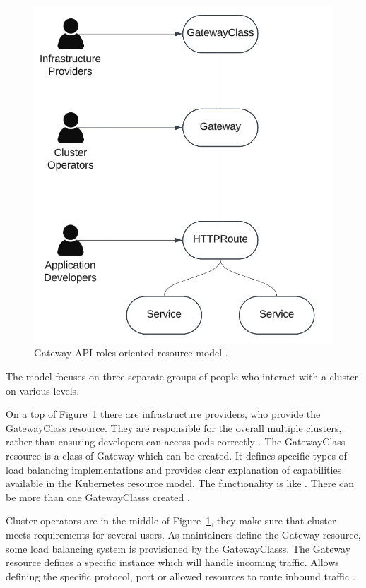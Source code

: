 \begin{figure}[tbh]
    \centering
    \includegraphics[width=0.7\columnwidth]{images/gateway-api-resource-model.png}
    \caption{Gateway API roles-oriented resource model \cite{KubernetesGatewayAPI}.}
    \label{fig:gatewayApiResourceModel}
\end{figure}

The model focuses on three separate groups of people who interact with a cluster on various levels. 

On a top of Figure~\ref{fig:gatewayApiResourceModel} there are infrastructure providers, who provide the GatewayClass resource. They are responsible for the overall multiple clusters, rather than ensuring developers can access pods correctly \cite{KubernetesGatewayAPI}. The GatewayClass resource is a class of Gateway which can be created. It defines specific types of load balancing implementations and provides clear explanation of capabilities available in the Kubernetes resource model. The functionality is like \textit{}. There can be more than one GatewayClasss created \cite{KubernetesGatewayAPI}. 


Cluster operators are in the middle of Figure~\ref{fig:gatewayApiResourceModel}, they make sure that cluster meets requirements for several users. As maintainers define the Gateway resource, some load balancing system is provisioned by the GatewayClasss. The Gateway resource defines a specific instance which will handle incoming traffic. Allows defining the specific protocol, port or allowed resources to route inbound traffic \cite{KubernetesGatewayAPI}.

